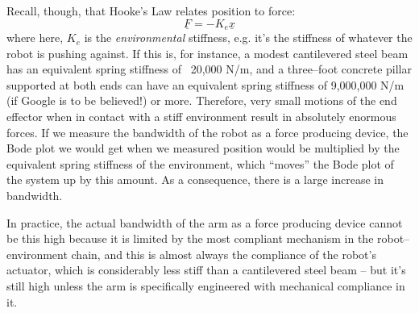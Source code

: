 \documentclass[]{article}
\begin{document}
Recall, though, that Hooke's Law relates position to force:
\begin{displaymath}
    \underline{F} = -K_{e}\underline{x}
\end{displaymath}
where here, $K_{e}$ is the \textit{environmental} stiffness, e.g. it's the stiffness of whatever the robot is pushing against. If this is, for instance, a modest cantilevered steel beam has an equivalent spring stiffness of ~20,000 N/m, and a three--foot concrete pillar supported at both ends can have an equivalent spring stiffness of 9,000,000 N/m (if Google is to be believed!) or more. Therefore, very small motions of the end effector when in contact with a stiff environment result in absolutely enormous forces. If we measure the bandwidth of the robot as a force producing device, the Bode plot we would get when we measured position would be multiplied by the equivalent spring stiffness of the environment, which ``moves'' the Bode plot of the system up by this amount. As a consequence, there is a large increase in bandwidth. 

In practice, the actual bandwidth of the arm as a force producing device cannot be this high because it is limited by the most compliant mechanism in the robot--environment chain, and this is almost always the compliance of the robot's actuator, which is considerably less stiff than a cantilevered steel beam -- but it's still high unless the arm is specifically engineered with mechanical compliance in it.
\end{document}
